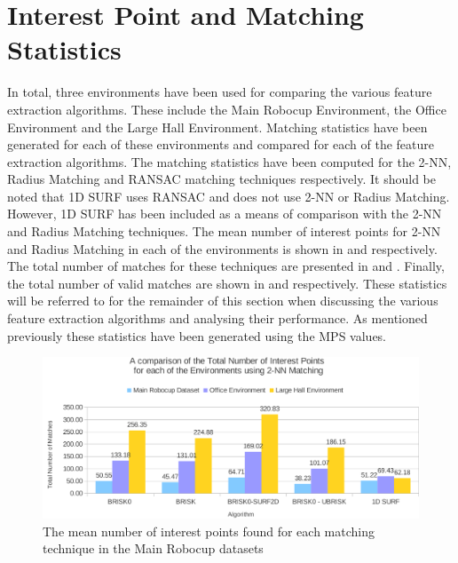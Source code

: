 \documentclass[11pt]{report}
\begin{document}
\section{Interest Point and Matching Statistics}
\label{sec:matchingStats}
In total, three environments have been used for comparing the various feature extraction algorithms. These include the Main Robocup Environment, the Office Environment and the Large Hall Environment. Matching statistics have been generated for each of these environments and compared for each of the feature extraction algorithms. The matching statistics have been computed for the 2-NN, Radius Matching and RANSAC matching techniques respectively. It should be noted that 1D SURF uses RANSAC and does not use 2-NN or Radius Matching. However, 1D SURF has been included as a means of comparison with the 2-NN and Radius Matching techniques. The mean number of interest points for 2-NN and Radius Matching in each of the environments is shown in  and  respectively. The total number of matches for these techniques are presented in  and . Finally, the total number of valid matches are shown in  and  respectively. These statistics will be referred to for the remainder of this section when discussing the various feature extraction algorithms and analysing their performance. As mentioned previously these statistics have been generated using the MPS values.\\

 \begin{figure}%
  \centering
    \includegraphics[width=1.0\textwidth]{../Drawings/Graphs/overall_tn_ip.pdf}
    \caption{The mean number of interest points found for each matching technique in the Main Robocup datasets} 
    \label{fig:overall_tn_ip}
 \end{figure}
 
\end{document}
